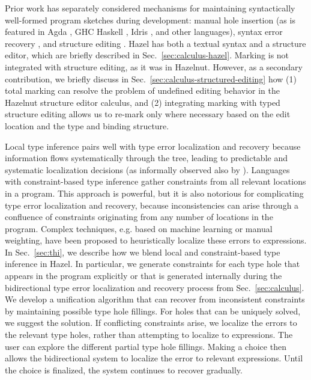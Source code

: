 Prior work has separately considered mechanisms for maintaining syntactically well-formed program sketches during development: manual hole insertion (as is featured in Agda \cite{agda}, GHC Haskell \cite{haskell-holes}, Idris \cite{idris-holes}, and other languages), syntax error recovery \cite{error-reovery}, and structure editing \cite{HazelnutPOPL}. 
Hazel has both a textual syntax and a structure editor, which are briefly described in Sec.~\ref{sec:calculus-hazel}. 
Marking is not integrated with structure editing, as it was in Hazelnut. 
However, as a secondary contribution, 
we briefly discuss in Sec.~\ref{sec:calculus-structured-editing} how (1)  total marking can resolve the problem of undefined editing behavior in the Hazelnut structure editor calculus, 
and (2) integrating marking with typed structure editing allows us to re-mark only where necessary based on the edit location and the type and binding structure.

Local type inference pairs well with type error localization and recovery because information flows systematically through the tree, leading to predictable and systematic localization decisions (as informally observed also by \cite{pierce}). Languages with constraint-based type inference gather constraints from all relevant locations in a program. This approach is powerful, but it is also notorious for complicating type error localization and recovery, because inconsistencies can arise through a confluence of constraints originating from any number of locations in the program. 
Complex techniques, e.g. based on machine learning or manual weighting, have been proposed to heuristically localize these errors to expressions. 
In Sec.~\ref{sec:thi}, we describe how we blend local and constraint-based type inference in Hazel. In particular,  
we generate constraints for each type hole that appears in the program explicitly or that is  generated internally during the  bidirectional type error localization and recovery process from Sec.~\ref{sec:calculus}. 
We develop a unification algorithm that can recover from inconsistent constraints by maintaining possible type hole fillings. For holes that can be uniquely solved, we suggest the solution. 
If conflicting constraints arise, we localize the errors to the relevant type holes, rather 
than attempting to localize to expressions. 
The user can explore the different partial type hole fillings. Making a choice then allows the bidirectional system to localize the error to relevant expressions.
Until the choice is finalized, the system continues to recover gradually.


